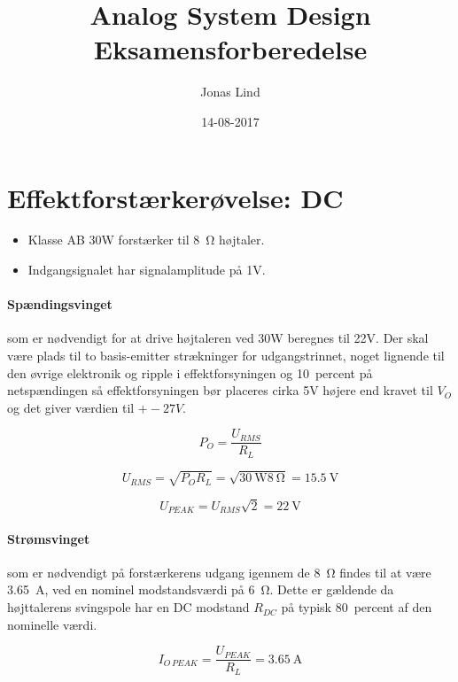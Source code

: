 \documentclass[danish]{article}
\begin{document}
\title{\textbf{ Analog System Design }   Eksamensforberedelse}
\author{Jonas Lind}
\date{14-08-2017}
\maketitle
\section{Effektforstærkerøvelse: DC}
\begin{itemize}
	\item Klasse AB 30W forstærker til \SI{8}{\ohm} højtaler.
	\item Indgangsignalet har signalamplitude på 1V.
\end{itemize}

\paragraph{Spændingsvinget} som er nødvendigt for at drive højtaleren ved 30W beregnes til 22V. Der skal være plads til to basis-emitter strækninger for udgangstrinnet, noget lignende til den øvrige elektronik og ripple i effektforsyningen og  \SI{10}{percent}  på netspændingen så effektforsyningen bør placeres cirka 5V højere end kravet til $V_O$ og det giver værdien til $+-27V$.

\begin{equation}
P_O = \dfrac{U_{RMS}}{R_L}
\end{equation}

\begin{equation}
U_{RMS} = \sqrt{P_O R_L} = \sqrt{\SI{30}{\watt} \SI{8}{\ohm}} = \SI{15.5}{\volt}
\end{equation}

\begin{equation}
U_{PEAK} = U_{RMS} \sqrt{2} = \SI{22}{\volt}
\end{equation}
\paragraph{Strømsvinget} som er nødvendigt på forstærkerens udgang igennem de \SI{8}{\ohm} findes til at være \SI{3.65}{\ampere}, ved en nominel modstandsværdi på \SI{6}{\ohm}. Dette er gældende da højttalerens svingspole har en DC modstand $R_{DC}$ på typisk \SI{80}{percent}  af den nominelle værdi.

\begin{equation}
I_{O\,PEAK} = \dfrac{U_{PEAK}}{R_L} = \SI{3.65}{\ampere}
\end{equation}
\end{document}

